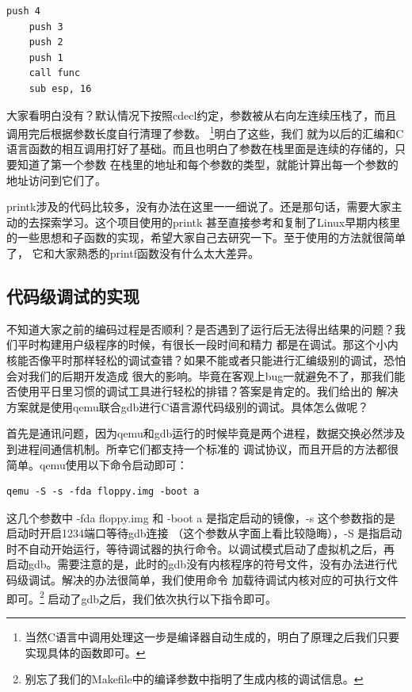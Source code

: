 \begin{lstlisting}[language = {[x86masm]Assembler}, caption = 函数调用]
	push 4
	push 3
	push 2
	push 1
	call func
	sub esp, 16
\end{lstlisting}

\par 大家看明白没有？默认情况下按照cdecl约定，参数被从右向左连续压栈了，而且调用完后根据参数长度自行清理了参数。\allowbreak
\footnote{当然C语言中调用处理这一步是编译器自动生成的，明白了原理之后我们只要实现具体的函数即可。}明白了这些，我们\allowbreak
就为以后的汇编和C语言函数的相互调用打好了基础。而且也明白了参数在栈里面是连续的存储的，只要知道了第一个参数\allowbreak
在栈里的地址和每个参数的类型，就能计算出每一个参数的地址访问到它们了。

\par printk涉及的代码比较多，没有办法在这里一一细说了。还是那句话，需要大家主动的去探索学习。这个项目使用的printk\allowbreak
甚至直接参考和复制了Linux早期内核里的一些思想和子函数的实现，希望大家自己去研究一下。至于使用的方法就很简单了，\allowbreak
它和大家熟悉的printf函数没有什么太大差异。

\subsection{代码级调试的实现}

\par 不知道大家之前的编码过程是否顺利？是否遇到了运行后无法得出结果的问题？我们平时构建用户级程序的时候，有很长一段时间和精力\allowbreak
都是在调试。那这个小内核能否像平时那样轻松的调试查错？如果不能或者只能进行汇编级别的调试，恐怕会对我们的后期开发造成\allowbreak
很大的影响。毕竟在客观上bug一就避免不了，那我们能否使用平日里习惯的调试工具进行轻松的排错？答案是肯定的。我们给出的\allowbreak
解决方案就是使用qemu联合gdb进行C语言源代码级别的调试。具体怎么做呢？

\par 首先是通讯问题，因为qemu和gdb运行的时候毕竟是两个进程，数据交换必然涉及到进程间通信机制。所幸它们都支持一个标准的\allowbreak
调试协议，而且开启的方法都很简单。qemu使用以下命令启动即可：

\begin{Verbatim}[frame=single]
  qemu -S -s -fda floppy.img -boot a 
\end{Verbatim}

\par 这几个参数中 -fda floppy.img 和 -boot a 是指定启动的镜像，-s 这个参数指的是启动时开启1234端口等待gdb连接\allowbreak
（这个参数从字面上看比较隐晦），-S 是指启动时不自动开始运行，等待调试器的执行命令。以调试模式启动了虚拟机之后，再\allowbreak
启动gdb。需要注意的是，此时的gdb没有内核程序的符号文件，没有办法进行代码级调试。解决的办法很简单，我们使用命令\allowbreak
加载待调试内核对应的可执行文件即可。\footnote{别忘了我们的Makefile中的编译参数中指明了生成内核的调试信息。}\allowbreak
启动了gdb之后，我们依次执行以下指令即可。

